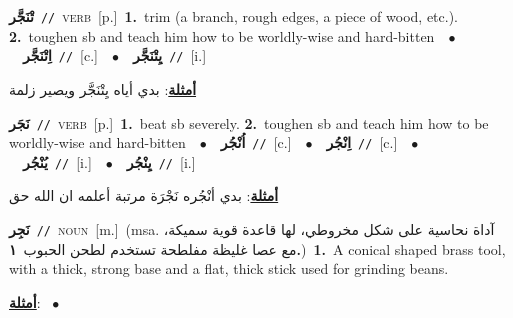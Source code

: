 \documentclass[10pt,a4paper,twoside]{article} %
\begin{document}
\begin{multicols}{2}
{\setlength\topsep{0pt}\textbf{\foreignlanguage{arabic}{تْنَجَّر}}\ {\color{gray}\texttt{//}\color{black}}\ \textsc{verb}\ [p.]\ \textbf{1.}~trim (a branch, rough edges, a piece of wood, etc.).  \textbf{2.}~toughen sb and teach him how to be worldly-wise and hard-bitten\ \ $\bullet$\ \ \setlength\topsep{0pt}\textbf{\foreignlanguage{arabic}{اِتْنَجَّر}}\ {\color{gray}\texttt{//}\color{black}}\ [c.]\ \ $\bullet$\ \ \setlength\topsep{0pt}\textbf{\foreignlanguage{arabic}{يِتْنَجَّر}}\ {\color{gray}\texttt{//}\color{black}}\ [i.]\  \begin{flushright}\color{gray}\foreignlanguage{arabic}{\textbf{\underline{\foreignlanguage{arabic}{أمثلة}}}: بدي أياه يِتْنَجَّر ويصير زلمة}\end{flushright}\color{black}} \vspace{2mm}

{\setlength\topsep{0pt}\textbf{\foreignlanguage{arabic}{نَجَر}}\ {\color{gray}\texttt{//}\color{black}}\ \textsc{verb}\ [p.]\ \textbf{1.}~beat sb severely.  \textbf{2.}~toughen sb and teach him how to be worldly-wise and hard-bitten\ \ $\bullet$\ \ \setlength\topsep{0pt}\textbf{\foreignlanguage{arabic}{اُنْجُر}}\ {\color{gray}\texttt{//}\color{black}}\ [c.]\ \ $\bullet$\ \ \setlength\topsep{0pt}\textbf{\foreignlanguage{arabic}{اِنْجُر}}\ {\color{gray}\texttt{//}\color{black}}\ [c.]\ \ $\bullet$\ \ \setlength\topsep{0pt}\textbf{\foreignlanguage{arabic}{يُنْجُر}}\ {\color{gray}\texttt{//}\color{black}}\ [i.]\ \ $\bullet$\ \ \setlength\topsep{0pt}\textbf{\foreignlanguage{arabic}{يِنْجُر}}\ {\color{gray}\texttt{//}\color{black}}\ [i.]\  \begin{flushright}\color{gray}\foreignlanguage{arabic}{\textbf{\underline{\foreignlanguage{arabic}{أمثلة}}}: بدي أنْجُره نَجْرَة مرتبة أعلمه ان الله حق}\end{flushright}\color{black}} \vspace{2mm}

{\setlength\topsep{0pt}\textbf{\foreignlanguage{arabic}{نَجِر}}\ {\color{gray}\texttt{//}\color{black}}\ \textsc{noun}\ [m.]\ \color{gray}(msa. \foreignlanguage{arabic}{آداة نحاسية على شكل مخروطي، لها قاعدة قوية سميكة، مع عصا غليظة مفلطحة تستخدم لطحن الحبوب}~\foreignlanguage{arabic}{\textbf{١.}})\color{black}\ \textbf{1.}~A conical shaped brass tool, with a thick, strong base and a flat, thick stick used for grinding beans.\  \begin{flushright}\color{gray}\foreignlanguage{arabic}{\textbf{\underline{\foreignlanguage{arabic}{أمثلة}}}: \ $\bullet$\ \  }\end{flushright}\color{black}} \vspace{2mm}


\end{multicols}
\end{document}
